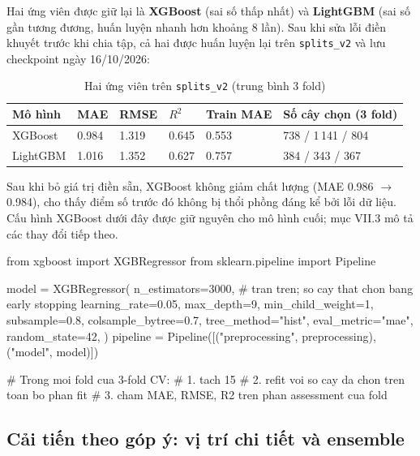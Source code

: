 \documentclass[11pt]{article}
\begin{document}
Hai ứng viên được giữ lại là \textbf{XGBoost} (sai số thấp nhất) và \textbf{LightGBM} (sai số gần tương
đương, huấn luyện nhanh hơn khoảng 8 lần). Sau khi sửa lỗi điền khuyết trước khi chia tập, cả hai được
huấn luyện lại trên \texttt{splits\_v2} và lưu checkpoint ngày 16/10/2026:

\begin{table}[H]
\centering
\small
\caption{Hai ứng viên trên \texttt{splits\_v2} (trung bình 3 fold)}
\begin{tabular}{@{}L{0.16\textwidth}L{0.10\textwidth}L{0.10\textwidth}L{0.10\textwidth}L{0.12\textwidth}L{0.28\textwidth}@{}}
\toprule
\textbf{Mô hình} & \textbf{MAE} & \textbf{RMSE} & \textbf{$R^2$} & \textbf{Train MAE} & \textbf{Số cây chọn (3 fold)} \\
\midrule
XGBoost & 0.984 & 1.319 & 0.645 & 0.553 & 738 / 1\,141 / 804 \\
LightGBM & 1.016 & 1.352 & 0.627 & 0.757 & 384 / 343 / 367 \\
\bottomrule
\end{tabular}
\end{table}

Sau khi bỏ giá trị điền sẵn, XGBoost không giảm chất lượng (MAE 0.986 $\rightarrow$ 0.984), cho thấy
điểm số trước đó không bị thổi phồng đáng kể bởi lỗi dữ liệu. Cấu hình XGBoost dưới đây được giữ nguyên cho
mô hình cuối; mục VII.3 mô tả các thay đổi tiếp theo.

\begin{codebox}[title={Cấu hình XGBoost được chọn}]
from xgboost import XGBRegressor
from sklearn.pipeline import Pipeline

model = XGBRegressor(
    n_estimators=3000,      # tran tren; so cay that chon bang early stopping
    learning_rate=0.05,
    max_depth=9,
    min_child_weight=1,
    subsample=0.8,
    colsample_bytree=0.7,
    tree_method="hist",
    eval_metric="mae",
    random_state=42,
)
pipeline = Pipeline([("preprocessing", preprocessing), ("model", model)])

# Trong moi fold cua 3-fold CV:
#   1. tach 15%
#   2. refit voi so cay da chon tren toan bo phan fit
#   3. cham MAE, RMSE, R2 tren phan assessment cua fold
\end{codebox}

\subsection{Cải tiến theo góp ý: vị trí chi tiết và ensemble}
\end{document}
